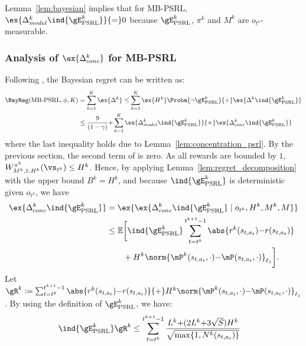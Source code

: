 \begin{subappendices}
Lemma~\ref{lem:bayesian} implies that for MB-PSRL, $\ex{\Delta_{model}^k \ind{\gE^{k}_\text{PSRL}}}{=}0$ because
$\gE^{k}_\text{PSRL}$, $\pi^k$ and $M^k$ are $o_{t^k}$-measurable. 

\subsubsection{Analysis of $\ex{\Delta_{conc}^k}$ for MB-PSRL}
Following , the Bayesian regret can be written as:
\begin{align}
    \BayReg(\textnormal{MB-PSRL},\phi,K)
    &= \sum_{k=1}^K \ex{\Delta^k} \le \sum_{k=1}^{K}\ex{H^k}\Proba{\neg \gE_\text{PSRL}^{k}} {+}\ex{\Delta^k \ind{\gE_\text{PSRL}^{k}}} \nonumber \\
    &\le \frac{9}{(1-\gamma)} {+} \sum_{k=1}^{K} \ex{\Delta_{model}^k\ind{\gE_\text{PSRL}^{k}}} {+} \ex{\Delta_{conc}^k\ind{\gE_\text{PSRL}^{k}}}
    \label{eq:proof_PSRL_regret}
\end{align}
where the last inequality holds due to Lemma~\ref{lem:concentration_psrl}.
By the previous section, the second term of  is zero.
As all rewards are bounded by $1$, $W_{M^k,1:H^k}^{\pi^k}(\vs_{t^k})\le H^k$. Hence, by applying Lemma~\ref{lem:regret_decomposition} with the upper bound $B^k=H^k$, and because $\ind{\gE^{k}_\text{PSRL}}$ is deterministic given $o_{t^k}$, we have
\begin{align}
    \ex{\Delta^k_{conc} \ind{\gE^{k}_\text{PSRL}}}
    &= \ex{\ex{\Delta^k_{conc} \ind{\gE^{k}_\text{PSRL}} \mid o_{t^k}, H^k, M^k, M}} \nonumber \\
    &\le \mathbb{E}\bigg[ \ind{\gE^{k}_\text{PSRL}} \sum_{t=t^k}^{t^{k+1}-1}\abs{r^k(s_{t,a_t}){-}r(s_{t,a_t})} \nonumber\\
    &\qquad +H^k\norm{\mP^{k}(s_{t,a_t},\cdot){-}\mP(s_{t,a_t},\cdot)}_{\ell_1} \bigg]. \label{eq:conc_with_i}
\end{align}
Let $\gR^k := \sum_{t=t^k}^{t^{k+1}-1}\abs{r^k(s_{t,a_t}){-}r(s_{t,a_t})} {+}H^k\norm{\mP^{k}(s_{t,a_t},\cdot){-}\mP(s_{t,a_t},\cdot)}_{\ell_1}$. 
By using the definition of $\gE^{k}_\text{PSRL}$, we have:
\begin{align}
    \ind{\gE^{k}_\text{PSRL}}\gR^k 
    &\le \sum_{t=t^k}^{t^{k+1}-1} \frac{L^{k}{+}(2L^{k} {+}3\sqrt{S})H^k}{\sqrt{\max\{1,N^{k}(s_{t,a_t})\} }} \label{eq:PSRL_R_k}

\end{align}
\end{subappendices}
